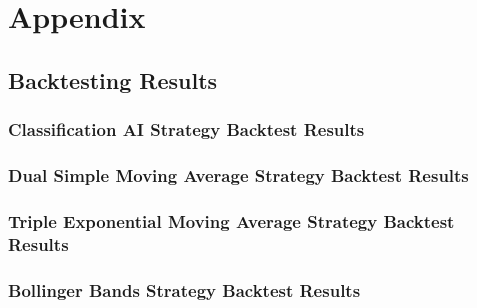 \section{Appendix}

\subsection{Backtesting Results}
\label{chap:backtest-results}

\subsubsection{Classification AI Strategy Backtest Results}

\begin{table}
    
\end{table}
\begin{table}
    
\end{table}
\begin{table}
    
\end{table}

\subsubsection{Dual Simple Moving Average Strategy Backtest Results}

\begin{table}
    
\end{table}
\begin{table}
    
\end{table}
\begin{table}
    
\end{table}

\subsubsection{Triple Exponential Moving Average Strategy Backtest Results}

\begin{table}
    \centering
\end{table}
\begin{table}
    \centering
\end{table}
\begin{table}
    \centering
\end{table}

\subsubsection{Bollinger Bands Strategy Backtest Results}

\begin{table}
    
\end{table}
\begin{table}
    
\end{table}
\begin{table}
    
\end{table}
